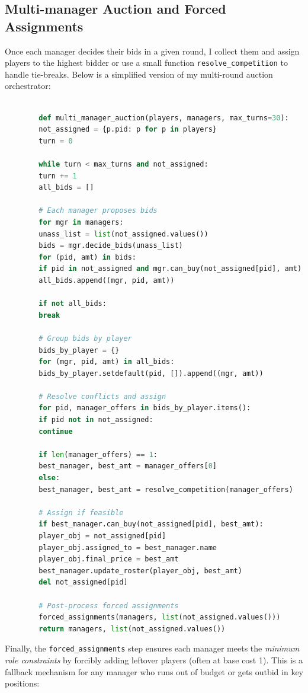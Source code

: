 \documentclass[sigconf]{acmart}
\begin{document}
	
	\subsection{Multi-manager Auction and Forced Assignments}
	Once each manager decides their bids in a given round, I collect them and assign players to the highest bidder or use a small function \texttt{resolve\_competition} to handle tie-breaks. Below is a simplified version of my multi-round auction orchestrator:
	
	\begin{lstlisting}[language=Python, caption=Multi-manager auction framework]
		
		def multi_manager_auction(players, managers, max_turns=30):
		not_assigned = {p.pid: p for p in players}
		turn = 0
		
		while turn < max_turns and not_assigned:
		turn += 1
		all_bids = []
		
		# Each manager proposes bids
		for mgr in managers:
		unass_list = list(not_assigned.values())
		bids = mgr.decide_bids(unass_list)
		for (pid, amt) in bids:
		if pid in not_assigned and mgr.can_buy(not_assigned[pid], amt):
		all_bids.append((mgr, pid, amt))
		
		if not all_bids:
		break
		
		# Group bids by player
		bids_by_player = {}
		for (mgr, pid, amt) in all_bids:
		bids_by_player.setdefault(pid, []).append((mgr, amt))
		
		# Resolve conflicts and assign
		for pid, manager_offers in bids_by_player.items():
		if pid not in not_assigned:
		continue
		
		if len(manager_offers) == 1:
		best_manager, best_amt = manager_offers[0]
		else:
		best_manager, best_amt = resolve_competition(manager_offers)
		
		# Assign if feasible
		if best_manager.can_buy(not_assigned[pid], best_amt):
		player_obj = not_assigned[pid]
		player_obj.assigned_to = best_manager.name
		player_obj.final_price = best_amt
		best_manager.update_roster(player_obj, best_amt)
		del not_assigned[pid]
		
		# Post-process forced assignments
		forced_assignments(managers, list(not_assigned.values()))
		return managers, list(not_assigned.values())
	\end{lstlisting}
	
	
	Finally, the \texttt{forced\_assignments} step ensures each manager meets the \emph{minimum role constraints} by forcibly adding leftover players (often at base cost 1). This is a fallback mechanism for any manager who runs out of budget or gets outbid in key positions:
	
\end{document}

